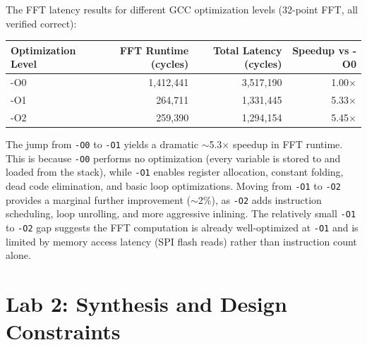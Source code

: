 \documentclass{article}
\begin{document}
\begin{tcolorbox}[colback=white, colframe=black, width=\textwidth, title=Answer 1.5]

The FFT latency results for different GCC optimization levels (32-point FFT, all verified correct):

\vspace{0.2cm}

\begin{tabular}{@{}lrrr@{}}
\toprule
\textbf{Optimization Level} & \textbf{FFT Runtime (cycles)} & \textbf{Total Latency (cycles)} & \textbf{Speedup vs -O0} \\
\midrule
-O0 & 1{,}412{,}441 & 3{,}517{,}190 & 1.00$\times$ \\
-O1 & 264{,}711   & 1{,}331{,}445 & 5.33$\times$ \\
-O2 & 259{,}390   & 1{,}294{,}154 & 5.45$\times$ \\
\bottomrule
\end{tabular}

\vspace{0.3cm}

The jump from \texttt{-O0} to \texttt{-O1} yields a dramatic $\sim$5.3$\times$ speedup in FFT runtime. This is because \texttt{-O0} performs no optimization (every variable is stored to and loaded from the stack), while \texttt{-O1} enables register allocation, constant folding, dead code elimination, and basic loop optimizations. Moving from \texttt{-O1} to \texttt{-O2} provides a marginal further improvement ($\sim$2\%), as \texttt{-O2} adds instruction scheduling, loop unrolling, and more aggressive inlining. The relatively small \texttt{-O1} to \texttt{-O2} gap suggests the FFT computation is already well-optimized at \texttt{-O1} and is limited by memory access latency (SPI flash reads) rather than instruction count alone.

\end{tcolorbox}

\newpage

\section{Lab 2: Synthesis and Design Constraints}

\end{document}
